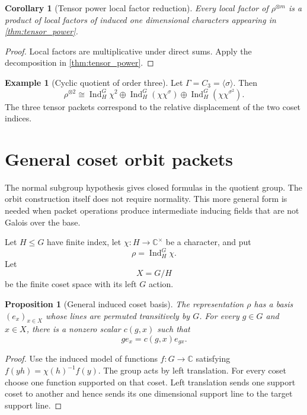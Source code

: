 \documentclass{aomart}
\newtheorem{proposition}[proposition]{Proposition}
\newtheorem{corollary}[corollary]{Corollary}
\theoremstyle{definition}
\newtheorem{example}[example]{Example}
\theoremstyle{remark}
\newcommand{\CC}{\mathbb C}
\newcommand{\Ind}{\operatorname{Ind}}
\begin{document}
\begin{corollary}[Tensor power local factor reduction]\label{cor:tensor_power_factor_reduction}
Every local factor of \(\rho^{\otimes m}\) is a product of local factors of induced one dimensional characters appearing in \cref{thm:tensor_power}.
\end{corollary}

\begin{proof}
Local factors are multiplicative under direct sums. Apply the decomposition in \cref{thm:tensor_power}.
\end{proof}

\begin{example}[Cyclic quotient of order three]\label{ex:tensor_c3}
Let \(\Gamma=C_3=\langle\sigma\rangle\). Then
\[
\rho^{\otimes2}
\cong
\Ind_H^G\chi^2
\oplus
\Ind_H^G(\chi\chi^\sigma)
\oplus
\Ind_H^G(\chi\chi^{\sigma^2}).
\]
The three tensor packets correspond to the relative displacement of the two coset indices.
\end{example}


\section{General coset orbit packets}\label{sec:general_coset}

The normal subgroup hypothesis gives closed formulas in the quotient group. The orbit construction itself does not require normality. This more general form is needed when packet operations produce intermediate inducing fields that are not Galois over the base.

Let \(H\leq G\) have finite index, let \(\chi:H\to\CC^\times\) be a character, and put
\[
\rho=\Ind_H^G\chi.
\]
Let
\[
X=G/H
\]
be the finite coset space with its left \(G\) action.

\begin{proposition}[General induced coset basis]\label{prop:general_coset_basis}
The representation \(\rho\) has a basis \((e_x)_{x\in X}\) whose lines are permuted transitively by \(G\). For every \(g\in G\) and \(x\in X\), there is a nonzero scalar \(c(g,x)\) such that
\[
\boxed{
 ge_x=c(g,x)e_{gx}.
}
\]
\end{proposition}

\begin{proof}
Use the induced model of functions \(f:G\to\CC\) satisfying \(f(yh)=\chi(h)^{-1}f(y)\). The group acts by left translation. For every coset choose one function supported on that coset. Left translation sends one support coset to another and hence sends its one dimensional support line to the target support line.
\end{proof}
\end{document}

